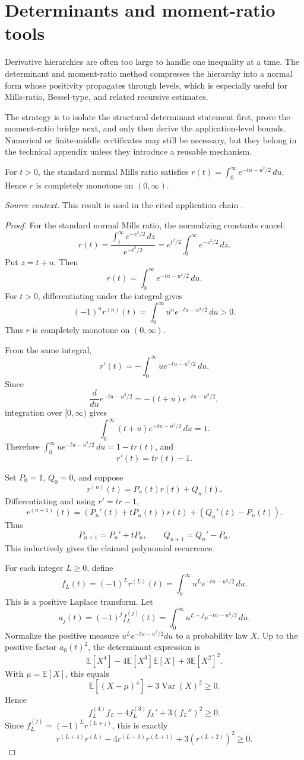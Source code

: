 \section{Determinants and moment-ratio tools}
Derivative hierarchies are often too large to handle one inequality at a time.  The determinant and moment-ratio method compresses the hierarchy into a normal form whose positivity propagates through levels, which is especially useful for Mills-ratio, Bessel-type, and related recursive estimates.

The strategy is to isolate the structural determinant statement first, prove the moment-ratio bridge next, and only then derive the application-level bounds.  Numerical or finite-middle certificates may still be necessary, but they belong in the technical appendix unless they introduce a reusable mechanism.
\begin{theorem}
\label{res:from-mills-laplace-cm-normal-form}
For \(t>0\), the standard normal Mills ratio satisfies \(r(t)=\int_0^\infty e^{-tu-u^2/2}\,du\). Hence \(r\) is completely monotone on \((0,\infty)\).

\emph{Source context.} This result is used in the cited application chain \cite{app-app-0042-source,from-mills}.
\end{theorem}
\begin{proof}
For the standard normal Mills ratio, the normalizing constants cancel:
\[
r(t)=\frac{\int_t^\infty e^{-z^2/2}\,dz}{e^{-t^2/2}}
=e^{t^2/2}\int_t^\infty e^{-z^2/2}\,dz.
\]
Put \(z=t+u\). Then
\[
r(t)=\int_0^\infty e^{-tu-u^2/2}\,du.
\]
For \(t>0\), differentiating under the integral gives
\[
(-1)^n r^{(n)}(t)=\int_0^\infty u^n e^{-tu-u^2/2}\,du>0.
\]
Thus \(r\) is completely monotone on \((0,\infty)\).

From the same integral,
\[
r'(t)=-\int_0^\infty u e^{-tu-u^2/2}\,du.
\]
Since
\[
\frac{d}{du}e^{-tu-u^2/2}=-(t+u)e^{-tu-u^2/2},
\]
integration over \([0,\infty)\) gives
\[
\int_0^\infty (t+u)e^{-tu-u^2/2}\,du=1.
\]
Therefore \(\int_0^\infty u e^{-tu-u^2/2}\,du=1-tr(t)\), and
\[
r'(t)=tr(t)-1.
\]

Set \(P_0=1\), \(Q_0=0\), and suppose
\[
r^{(n)}(t)=P_n(t)r(t)+Q_n(t).
\]
Differentiating and using \(r'=tr-1\),
\[
r^{(n+1)}(t)=(P_n'(t)+tP_n(t))r(t)+(Q_n'(t)-P_n(t)).
\]
Thus
\[
P_{n+1}=P_n'+tP_n,\qquad Q_{n+1}=Q_n'-P_n.
\]
This inductively gives the claimed polynomial recurrence.

For each integer \(L\ge0\), define
\[
f_L(t)=(-1)^L r^{(L)}(t)=\int_0^\infty u^L e^{-tu-u^2/2}\,du.
\]
This is a positive Laplace transform. Let
\[
a_j(t)=(-1)^j f_L^{(j)}(t)=\int_0^\infty u^{L+j}e^{-tu-u^2/2}\,du.
\]
Normalize the positive measure \(u^L e^{-tu-u^2/2}du\) to a probability law \(X\). Up to the positive factor \(a_0(t)^2\), the determinant expression is
\[
\mathbb E[X^4]-4\mathbb E[X^3]\mathbb E[X]+3\mathbb E[X^2]^2.
\]
With \(\mu=\mathbb E[X]\), this equals
\[
\mathbb E[(X-\mu)^4]+3\operatorname{Var}(X)^2\ge0.
\]
Hence
\[
f_L^{(4)}f_L-4f_L^{(3)}f_L'+3(f_L'')^2\ge0.
\]
Since \(f_L^{(j)}=(-1)^L r^{(L+j)}\), this is exactly
\[
r^{(L+4)}r^{(L)}-4r^{(L+3)}r^{(L+1)}+3(r^{(L+2)})^2\ge0.
\]
\end{proof}

